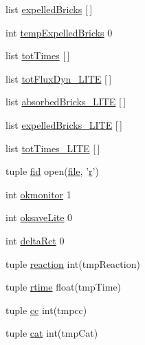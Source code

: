 \begin{DoxyCompactItemize}
\item 
list \hyperlink{namespacebuffered_flux_analysis_abb64e6cc33529d672b220bca854fcc5c}{expelled\-Bricks} \mbox{[}$\,$\mbox{]}
\item 
int \hyperlink{namespacebuffered_flux_analysis_a496cf2986cc324a0421c288991e1be93}{temp\-Expelled\-Bricks} 0
\item 
list \hyperlink{namespacebuffered_flux_analysis_a11c5182cf16d185b8ebd807aff4eb839}{tot\-Times} \mbox{[}$\,$\mbox{]}
\item 
list \hyperlink{namespacebuffered_flux_analysis_afc46fc569c50ea77d9dd0a6a1e9eb438}{tot\-Flux\-Dyn\-\_\-\-L\-I\-T\-E} \mbox{[}$\,$\mbox{]}
\item 
list \hyperlink{namespacebuffered_flux_analysis_a4d8afcc76cdbe3ba251368426147cefd}{absorbed\-Bricks\-\_\-\-L\-I\-T\-E} \mbox{[}$\,$\mbox{]}
\item 
list \hyperlink{namespacebuffered_flux_analysis_a6add3eeb2b7903c31bd378684f0ae0f7}{expelled\-Bricks\-\_\-\-L\-I\-T\-E} \mbox{[}$\,$\mbox{]}
\item 
list \hyperlink{namespacebuffered_flux_analysis_afe01d8621771212d5e3d525f70d78090}{tot\-Times\-\_\-\-L\-I\-T\-E} \mbox{[}$\,$\mbox{]}
\item 
tuple \hyperlink{namespacebuffered_flux_analysis_a490a31896b3a0812a6e9ed57cd4be1c9}{fid} open(\hyperlink{inizializzatore___a_c_s_8m_ab790e1eaff8d62837eb7fe789b2b52c6}{file}, '\hyperlink{_k_s_search_launcher_8m_ac862e7284527eb913b1351c8bfb8e079}{r}')
\item 
int \hyperlink{namespacebuffered_flux_analysis_a25fb267e09b519680d3f5d767eaa526c}{okmonitor} 1
\item 
int \hyperlink{namespacebuffered_flux_analysis_a8df8abbeab32a9f551cce00c3f8fc1b5}{oksave\-Lite} 0
\item 
int \hyperlink{namespacebuffered_flux_analysis_ad074bf5da40fa7fb7978db66744aec56}{delta\-Rct} 0
\item 
tuple \hyperlink{namespacebuffered_flux_analysis_ae2f3c773b4d02cc6548fa0199cd93d81}{reaction} int(tmp\-Reaction)
\item 
tuple \hyperlink{namespacebuffered_flux_analysis_a3a242047ff630fce5bc0c36591a9b22b}{rtime} float(tmp\-Time)
\item 
tuple \hyperlink{namespacebuffered_flux_analysis_a81b885fbd3a11be21610fd96c82952b7}{cc} int(tmpcc)
\item 
tuple \hyperlink{namespacebuffered_flux_analysis_a651bc7229b13b20528ca1a79030c6ac7}{cat} int(tmp\-Cat)
\item 

\end{DoxyCompactItemize}
